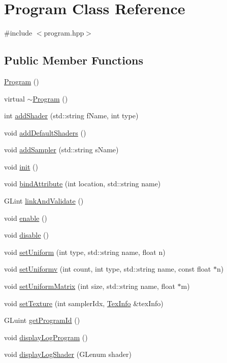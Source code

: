 \hypertarget{classProgram}{\section{Program Class Reference}
\label{classProgram}
}


{\ttfamily \#include $<$program.\-hpp$>$}

\subsection*{Public Member Functions}
\begin{DoxyCompactItemize}
\item 
\hyperlink{classProgram_aaefaa0df08f3484476fc4d61e97acbdc}{Program} ()
\item 
virtual \hyperlink{classProgram_a986aef1c50e1d338a3315a47ba6df549}{$\sim$\-Program} ()
\item 
int \hyperlink{classProgram_ade6fdcdf18bad44d602588eb2870baba}{add\-Shader} (std\-::string f\-Name, int type)
\item 
void \hyperlink{classProgram_a93a1c92516c590a6779438568ef729a5}{add\-Default\-Shaders} ()
\item 
void \hyperlink{classProgram_aea90548a29130479b1bcd0061ca86a8d}{add\-Sampler} (std\-::string s\-Name)
\item 
void \hyperlink{classProgram_a33d5912b81ccf4a0c089894513844580}{init} ()
\item 
void \hyperlink{classProgram_a047506f09edeb4f862f58599b232fd79}{bind\-Attribute} (int location, std\-::string name)
\item 
G\-Lint \hyperlink{classProgram_a457e11c867d335cdd815a657fa87e9b1}{link\-And\-Validate} ()
\item 
void \hyperlink{classProgram_ae435cb6813edc4ce2a8f91c99fb7a79b}{enable} ()
\item 
void \hyperlink{classProgram_ab9749de7ec9108233c5f632d9afaa0e9}{disable} ()
\item 
void \hyperlink{classProgram_ac342b7cadffa671c9a0164997a0141fb}{set\-Uniform} (int type, std\-::string name, float n)
\item 
void \hyperlink{classProgram_ad09d665e9a38943e9087243aab3d7162}{set\-Uniformv} (int count, int type, std\-::string name, const float $\ast$n)
\item 
void \hyperlink{classProgram_a28a7ee31d22c01c65e559699ef07f8ec}{set\-Uniform\-Matrix} (int size, std\-::string name, float $\ast$m)
\item 
void \hyperlink{classProgram_a5b8c3cba93ccaff73af2b61db3050775}{set\-Texture} (int sampler\-Idx, \hyperlink{structTexInfo}{Tex\-Info} \&tex\-Info)
\item 
G\-Luint \hyperlink{classProgram_a181ccd3b46d0c6d82c4a48faff268f82}{get\-Program\-Id} ()
\item 
void \hyperlink{classProgram_a76c829244760f9ddbee5da25b296dcb3}{display\-Log\-Program} ()
\item 
void \hyperlink{classProgram_a411a347acc65a576ab84bc464bd35b45}{display\-Log\-Shader} (G\-Lenum shader)
\end{DoxyCompactItemize}


